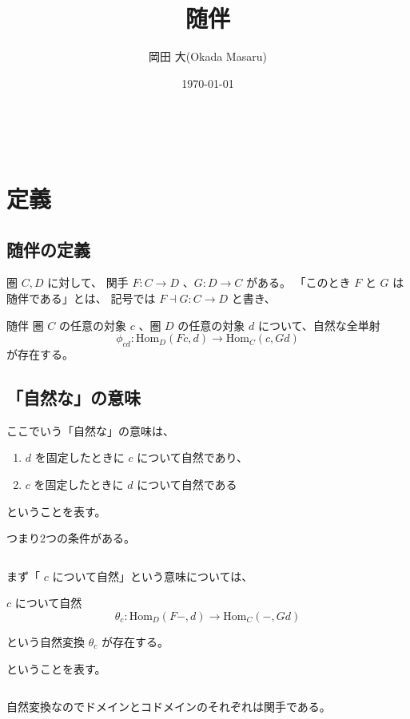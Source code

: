 \documentclass[uplatex,a4j,12pt,dvipdfmx]{jsarticle}
\title{
随伴
}
\author{岡田 大(Okada Masaru)}
\date{\today}
\begin{document}
\maketitle

\tableofcontents

\ \\

\section{定義}

\subsection{随伴の定義}

圏 $C,D$ に対して、
関手 $F: C \to D$ 、$G: D \to C$
がある。
「このとき $F$ と $G$ は随伴である」とは、
記号では $F \dashv G : C \to D$ と書き、

\begin{itembox}[l]{随伴}
	圏 $C$ の任意の対象 $c$ 、圏 $D$ の任意の対象 $d$ について、自然な全単射
	$$
		\phi_{cd} : \mathrm{Hom}_{D}(Fc,d) \to \mathrm{Hom}_{C}(c,Gd)
	$$
	が存在する。
\end{itembox}

\subsection{「自然な」の意味}

ここでいう「自然な」の意味は、
\begin{enumerate}
	\item $d$ を固定したときに $c$ について自然であり、
	\item $c$ を固定したときに $d$ について自然である
\end{enumerate}
ということを表す。

つまり2つの条件がある。

${}$


まず「 $c$ について自然」という意味については、

\begin{itembox}[l]{$c$ について自然}
	$$
		\theta_{c} : \mathrm{Hom}_{D}(F-,d) \to \mathrm{Hom}_{C}(-,Gd)
	$$

	という自然変換 $\theta_{c}$ が存在する。
\end{itembox}

ということを表す。

${}$

自然変換なのでドメインとコドメインのそれぞれは関手である。
\end{document}
